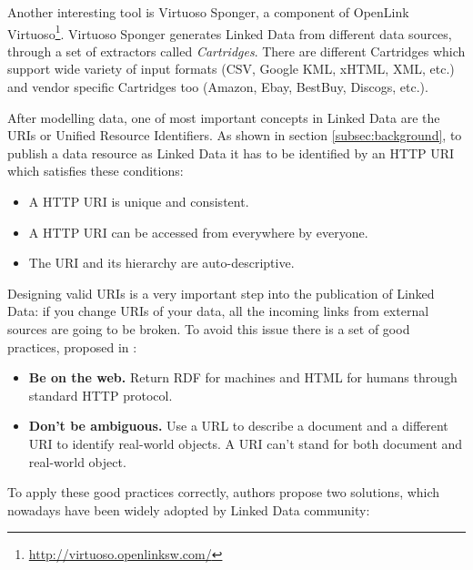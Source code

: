 Another interesting tool is Virtuoso Sponger, a component of OpenLink Virtuoso\footnote{\url{http://virtuoso.openlinksw.com/}}. Virtuoso Sponger generates Linked Data from different data sources, through a set of extractors called \textit{Cartridges}. There are different Cartridges which support wide variety of input formats (CSV, Google KML, xHTML, XML, etc.) and vendor specific Cartridges too (Amazon, Ebay, BestBuy, Discogs, etc.).

After modelling data, one of most important concepts in Linked Data are the URIs or Unified Resource Identifiers. As shown in section \ref{subsec:background}, to publish a data resource as Linked Data it has to be identified by an HTTP URI which satisfies these conditions:
\begin{itemize}
    \item A HTTP URI is unique and consistent.
    \item A HTTP URI can be accessed from everywhere by everyone.
    \item The URI and its hierarchy are auto-descriptive.
\end{itemize}

Designing valid URIs is a very important step into the publication of Linked Data: if you change URIs of your data, all the incoming links from external sources are going to be broken. To avoid this issue there is a set of good practices, proposed in \cite{ayers2008cool}:

\begin{itemize}
    \item \textbf{Be on the web.} Return RDF for machines and HTML for humans through standard HTTP protocol.
    \item \textbf{Don't be ambiguous.} Use a URL to describe a document and a different URI to identify real-world objects. A URI can't stand for both document and real-world object.
\end{itemize}

To apply these good practices correctly, authors propose two solutions, which nowadays have been widely adopted by Linked Data community:

